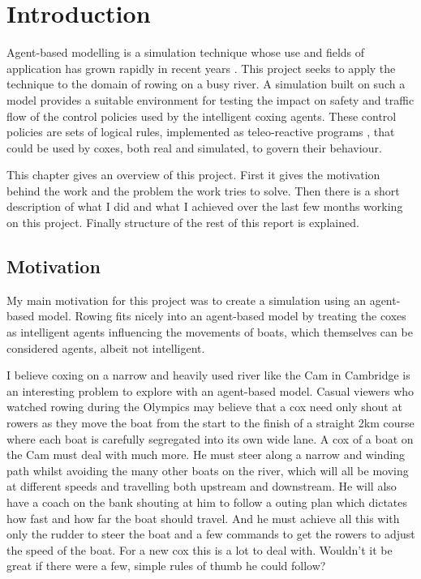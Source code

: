 \chapter{Introduction}\label{chapter:intro}
  Agent-based modelling is a simulation technique whose use and fields of application has grown rapidly in recent years \cite{Bonabeau2002, Miller2010, Chen2010, Helbing2000}. This project seeks to apply the technique to the domain of rowing on a busy river. A simulation built on such a model provides a suitable environment for testing the impact on safety and traffic flow of the control policies used by the intelligent coxing agents. These control policies are sets of logical rules, implemented as teleo-reactive programs \cite{Nilsson1994}, that could be used by coxes, both real and simulated, to govern their behaviour.

  This chapter gives an overview of this project. First it gives the motivation behind the work and the problem the work tries to solve. Then there is a short description of what I did and what I achieved over the last few months working on this project. Finally structure of the rest of this report is explained.

  \section{Motivation}
  My main motivation for this project was to create a simulation using an agent-based model. Rowing fits nicely into an agent-based model by treating the coxes as intelligent agents influencing the movements of boats, which themselves can be considered agents, albeit not intelligent.

  I believe coxing on a narrow and heavily used river like the Cam in Cambridge is an interesting problem to explore with an agent-based model. Casual viewers who watched rowing during the Olympics may believe that a cox need only shout at rowers as they move the boat from the start to the finish of a straight 2km course where each boat is carefully segregated into its own wide lane.
  A cox of a boat on the Cam must deal with much more. He must steer along a narrow and
  winding path whilst avoiding the many other boats on the river, which will all be moving at different speeds and travelling both upstream and downstream. He will also
  have a coach on the bank shouting at him to follow a outing plan
  which dictates how fast and how far the boat should travel. And he
  must achieve all this with only the rudder to steer the boat and a few commands to get the rowers to adjust the speed of the boat. For a new cox this is a lot to deal with. Wouldn't it be great if there were a few, simple rules of thumb he could follow?
  
